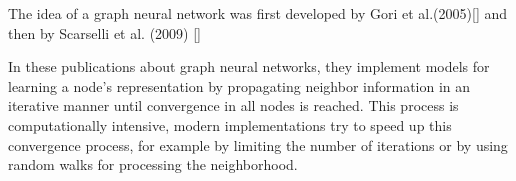 
The idea of a graph neural network was first developed by Gori et al.(2005)[] and then by Scarselli et al. (2009) []

In these publications about graph neural networks, they implement models for learning a node's representation by propagating neighbor information in an iterative manner until convergence in all nodes is reached. This process is computationally intensive, modern implementations try to speed up this convergence process, for example by limiting the number of iterations or by using random walks for processing the neighborhood.

























